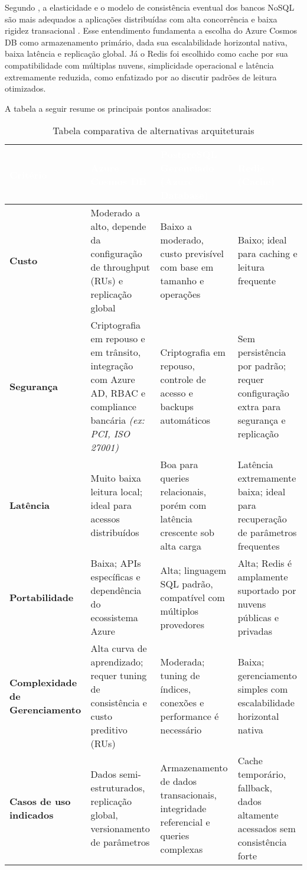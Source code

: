 Segundo , a elasticidade e o modelo de consistência eventual dos bancos NoSQL são mais adequados a aplicações distribuídas com alta concorrência e baixa rigidez transacional \cite{Ruparelia2016}. Esse entendimento fundamenta a escolha do Azure Cosmos DB como armazenamento primário, dada sua escalabilidade horizontal nativa, baixa latência e replicação global. Já o Redis foi escolhido como cache por sua compatibilidade com múltiplas nuvens, simplicidade operacional e latência extremamente reduzida, como enfatizado por  ao discutir padrões de leitura otimizados.

A tabela a seguir resume os principais pontos analisados:

\begin{table}[h]
	\centering
	\caption{Tabela comparativa de alternativas arquiteturais}
	\label{tab:comparativo}
	\begin{tabular}{p{3.2cm}p{3.8cm}p{3.8cm}p{3.8cm}}
		\toprule
		\rowcolor{headerpurple}
		\textcolor{white}{\textbf{Critério}} & \textcolor{white}{\textbf{Azure Cosmos DB}} & \textcolor{white}{\textbf{PostgreSQL Gerenciado (Azure Database)}} & \textcolor{white}{\textbf{Redis (Cache)}} \\
		\midrule
		\textbf{Custo} & Moderado a alto, depende da configuração de throughput (RUs) e replicação global & Baixo a moderado, custo previsível com base em tamanho e operações & Baixo; ideal para caching e leitura frequente \\
		\rowcolor{lightpurple}
		\textbf{Segurança} & Criptografia em repouso e em trânsito, integração com Azure AD, RBAC e compliance bancária \textit{(ex: PCI, ISO 27001)} & Criptografia em repouso, controle de acesso e backups automáticos & Sem persistência por padrão; requer configuração extra para segurança e replicação \\
		\textbf{Latência} & Muito baixa leitura local; ideal para acessos distribuídos & Boa para queries relacionais, porém com latência crescente sob alta carga & Latência extremamente baixa; ideal para recuperação de parâmetros frequentes \\
		\rowcolor{lightpurple}
		\textbf{Portabilidade} & Baixa; APIs específicas e dependência do ecossistema Azure & Alta; linguagem SQL padrão, compatível com múltiplos provedores & Alta; Redis é amplamente suportado por nuvens públicas e privadas \\
		\textbf{Complexidade de Gerenciamento} & Alta curva de aprendizado; requer tuning de consistência e custo preditivo (RUs) & Moderada; tuning de índices, conexões e performance é necessário & Baixa; gerenciamento simples com escalabilidade horizontal nativa \\
		\rowcolor{lightpurple}
		\textbf{Casos de uso indicados} & Dados semi-estruturados, replicação global, versionamento de parâmetros & Armazenamento de dados transacionais, integridade referencial e queries complexas & Cache temporário, fallback, dados altamente acessados sem consistência forte \\
		\bottomrule
	\end{tabular}
\end{table}

